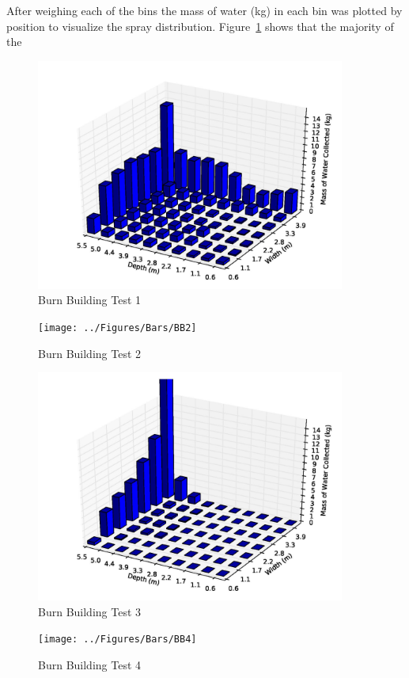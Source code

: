 \documentclass[12pt,oneside]{book}
\begin{document}
\clearpage

After weighing each of the bins the mass of water (kg) in each bin was plotted by position to visualize the spray distribution. Figure~\ref{fig:Burn_Building_Test_1} shows that the majority of the 

\begin{figure}[!ht]
	\includegraphics[width=4in]{../Figures/Bars/BB1}
	\caption{Burn Building Test 1}
	\label{fig:Burn_Building_Test_1}
\end{figure}

\begin{figure}[!ht]
	\texttt{[image: ../Figures/Bars/BB2]}
	\caption{Burn Building Test 2}
	\label{fig:Burn_Building_Test_2}
\end{figure}

\begin{figure}[!ht]
	\includegraphics[width=4in]{../Figures/Bars/BB3}
	\caption{Burn Building Test 3}
	\label{fig:Burn_Building_Test_3}
\end{figure}

\begin{figure}[!ht]
	\texttt{[image: ../Figures/Bars/BB4]}
	\caption{Burn Building Test 4}
	\label{fig:Burn_Building_Test_4}
\end{figure}
\end{document}
